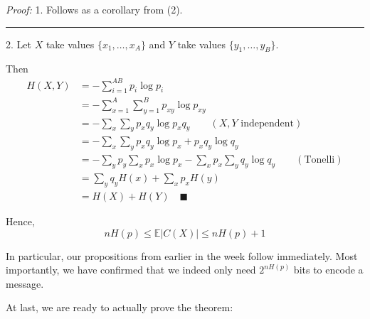 \documentclass[12pt]{report}
\newcommand{\E}{\mathbb{E}}
\newcommand{\qed}{\quad \blacksquare}
\newcommand{\abs}[1]{\left\vert #1 \right\vert}
\renewcommand{\div}{\vspace*{10pt}\hrule\vspace*{10pt}}
\newenvironment*{tbox}[2][gray]{
    \begin{tcolorbox}[
        parbox=false,
        colback=#1!5!white,
        colframe=#1!75!black,
        breakable,
        title={#2}
    ]}
    {\end{tcolorbox}}
\begin{document}
\begin{tbox}{\textbf{Claim:}
        \begin{enumerate}
            \item $H(\vec p) = nH(p)$.
            \item $H(X, Y) = H(X) + H(Y)$ if $X, Y$ independent
        \end{enumerate} }
    \emph{Proof:}
    1. Follows as a corollary from (2).

    \div

    2. Let $X$ take values $\{x_1, \dots, x_A\}$ and $Y$ take values $\{y_1, \dots, y_B\}$.

    Then
    \begin{align*}
        H(X, Y) & = -\sum_{i=1}^{AB} p_{i} \log p_{i}                                                        \\
                & = -\sum_{x=1}^A \sum_{y=1}^B p_{xy} \log p_{xy}                                            \\
                & = -\sum_x \sum_y p_x q_y \log p_x q_y \qquad (X, Y \text{ independent})                    \\
                & = -\sum_x \sum_y p_x q_y \log p_x + p_x q_y \log q_y                                       \\
                & = -\sum_y p_y \sum_x p_x \log p_x - \sum_x p_x \sum_y q_y \log q_y \qquad (\text{Tonelli}) \\
                & = \sum_y q_y H(x) + \sum_x p_x H(y)                                                        \\
                & = H(X) + H(Y) \qed
    \end{align*}
\end{tbox}

Hence,
\[nH(p)\leq \E{\abs{C(X)}} \leq nH(p) + 1\]

In particular, our propositions from earlier in the week follow immediately. Most importantly, we have confirmed that we indeed only need $2^{nH(p)}$ bits to encode a message.

At last, we are ready to actually prove the theorem:
\end{document}
